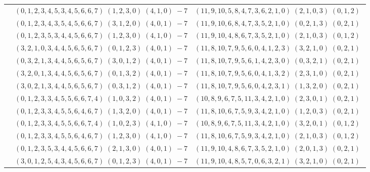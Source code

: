 \documentclass[11pt]{article}
\begin{document}
\begin{longtable}[l]{|c|c|c|}
 \cline{2-3} 
 & $(0 ,1 ,2 ,3 ,4 ,5 ,3 ,4 ,5 ,6 ,6 ,7) \;(1 ,2 ,3 ,0) \;(4 ,1 ,0) \;-7$ & $(11 ,9 ,10 ,5 ,8 ,4 ,7 ,3 ,6 ,2 ,1 ,0) \;(2 ,1 ,0 ,3) \;(0 ,1 ,2) \;$\\ 
 \cline{2-3} 
 & $(0 ,1 ,2 ,3 ,4 ,3 ,5 ,4 ,5 ,6 ,6 ,7) \;(3 ,1 ,2 ,0) \;(4 ,0 ,1) \;-7$ & $(11 ,9 ,10 ,6 ,8 ,4 ,7 ,3 ,5 ,2 ,1 ,0) \;(0 ,2 ,1 ,3) \;(0 ,2 ,1) \;$\\ 
 \cline{2-3} 
 & $(0 ,1 ,2 ,3 ,5 ,3 ,4 ,4 ,5 ,6 ,6 ,7) \;(1 ,2 ,3 ,0) \;(4 ,1 ,0) \;-7$ & $(11 ,9 ,10 ,4 ,8 ,6 ,7 ,3 ,5 ,2 ,1 ,0) \;(2 ,1 ,0 ,3) \;(0 ,1 ,2) \;$\\ 
 \cline{2-3} 
 & $(3 ,2 ,1 ,0 ,3 ,4 ,4 ,5 ,6 ,5 ,6 ,7) \;(0 ,1 ,2 ,3) \;(4 ,0 ,1) \;-7$ & $(11 ,8 ,10 ,7 ,9 ,5 ,6 ,0 ,4 ,1 ,2 ,3) \;(3 ,2 ,1 ,0) \;(0 ,2 ,1) \;$\\ 
 \cline{2-3} 
 & $(0 ,3 ,2 ,1 ,3 ,4 ,4 ,5 ,6 ,5 ,6 ,7) \;(3 ,0 ,1 ,2) \;(4 ,0 ,1) \;-7$ & $(11 ,8 ,10 ,7 ,9 ,5 ,6 ,1 ,4 ,2 ,3 ,0) \;(0 ,3 ,2 ,1) \;(0 ,2 ,1) \;$\\ 
 \cline{2-3} 
 & $(3 ,2 ,0 ,1 ,3 ,4 ,4 ,5 ,6 ,5 ,6 ,7) \;(0 ,1 ,3 ,2) \;(4 ,0 ,1) \;-7$ & $(11 ,8 ,10 ,7 ,9 ,5 ,6 ,0 ,4 ,1 ,3 ,2) \;(2 ,3 ,1 ,0) \;(0 ,2 ,1) \;$\\ 
 \cline{2-3} 
 & $(3 ,0 ,2 ,1 ,3 ,4 ,4 ,5 ,6 ,5 ,6 ,7) \;(0 ,3 ,1 ,2) \;(4 ,0 ,1) \;-7$ & $(11 ,8 ,10 ,7 ,9 ,5 ,6 ,0 ,4 ,2 ,3 ,1) \;(1 ,3 ,2 ,0) \;(0 ,2 ,1) \;$\\ 
 \cline{2-3} 
 & $(0 ,1 ,2 ,3 ,3 ,4 ,5 ,5 ,6 ,6 ,7 ,4) \;(1 ,0 ,3 ,2) \;(4 ,0 ,1) \;-7$ & $(10 ,8 ,9 ,6 ,7 ,5 ,11 ,3 ,4 ,2 ,1 ,0) \;(2 ,3 ,0 ,1) \;(0 ,2 ,1) \;$\\ 
 \cline{2-3} 
 & $(0 ,1 ,2 ,3 ,3 ,4 ,5 ,5 ,6 ,4 ,6 ,7) \;(1 ,3 ,2 ,0) \;(4 ,0 ,1) \;-7$ & $(11 ,8 ,10 ,6 ,7 ,5 ,9 ,3 ,4 ,2 ,1 ,0) \;(1 ,2 ,0 ,3) \;(0 ,2 ,1) \;$\\ 
 \cline{2-3} 
 & $(0 ,1 ,2 ,3 ,3 ,4 ,5 ,5 ,6 ,6 ,7 ,4) \;(1 ,0 ,2 ,3) \;(4 ,1 ,0) \;-7$ & $(10 ,8 ,9 ,6 ,7 ,5 ,11 ,3 ,4 ,2 ,1 ,0) \;(3 ,2 ,0 ,1) \;(0 ,1 ,2) \;$\\ 
 \cline{2-3} 
 & $(0 ,1 ,2 ,3 ,3 ,4 ,5 ,5 ,6 ,4 ,6 ,7) \;(1 ,2 ,3 ,0) \;(4 ,1 ,0) \;-7$ & $(11 ,8 ,10 ,6 ,7 ,5 ,9 ,3 ,4 ,2 ,1 ,0) \;(2 ,1 ,0 ,3) \;(0 ,1 ,2) \;$\\ 
 \cline{2-3} 
 & $(0 ,1 ,2 ,3 ,5 ,3 ,4 ,4 ,5 ,6 ,6 ,7) \;(2 ,1 ,3 ,0) \;(4 ,0 ,1) \;-7$ & $(11 ,9 ,10 ,4 ,8 ,6 ,7 ,3 ,5 ,2 ,1 ,0) \;(2 ,0 ,1 ,3) \;(0 ,2 ,1) \;$\\ 
 \cline{2-3} 
 & $(3 ,0 ,1 ,2 ,5 ,4 ,3 ,4 ,5 ,6 ,6 ,7) \;(0 ,1 ,2 ,3) \;(4 ,0 ,1) \;-7$ & $(11 ,9 ,10 ,4 ,8 ,5 ,7 ,0 ,6 ,3 ,2 ,1) \;(3 ,2 ,1 ,0) \;(0 ,2 ,1) \;$\\ 

\end{longtable}
\end{document}
